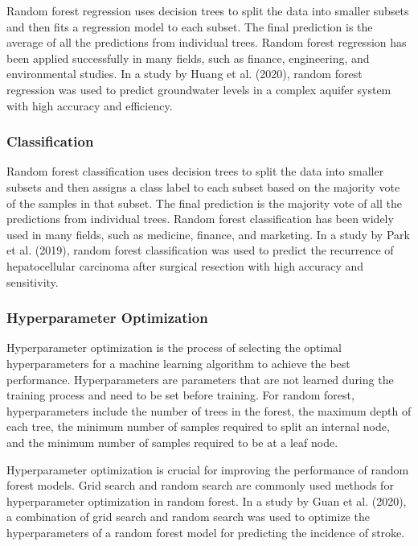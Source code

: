 Random forest regression uses decision trees to split the data into
smaller subsets and then fits a regression model to each subset. The
final prediction is the average of all the predictions from individual
trees. Random forest regression has been applied successfully in many
fields, such as finance, engineering, and environmental studies. In a
study by Huang et al. (2020), random forest regression was used to
predict groundwater levels in a complex aquifer system with high
accuracy and efficiency.

\hypertarget{classification}{%
\subsubsection{Classification}\label{classification}}

Random forest classification uses decision trees to split the data into
smaller subsets and then assigns a class label to each subset based on
the majority vote of the samples in that subset. The final prediction is
the majority vote of all the predictions from individual trees. Random
forest classification has been widely used in many fields, such as
medicine, finance, and marketing. In a study by Park et al. (2019),
random forest classification was used to predict the recurrence of
hepatocellular carcinoma after surgical resection with high accuracy and
sensitivity.

\hypertarget{hyperparameter-optimization}{%
\subsubsection{Hyperparameter
Optimization}\label{hyperparameter-optimization}}

Hyperparameter optimization is the process of selecting the optimal
hyperparameters for a machine learning algorithm to achieve the best
performance. Hyperparameters are parameters that are not learned during
the training process and need to be set before training. For random
forest, hyperparameters include the number of trees in the forest, the
maximum depth of each tree, the minimum number of samples required to
split an internal node, and the minimum number of samples required to be
at a leaf node.

Hyperparameter optimization is crucial for improving the performance of
random forest models. Grid search and random search are commonly used
methods for hyperparameter optimization in random forest. In a study by
Guan et al. (2020), a combination of grid search and random search was
used to optimize the hyperparameters of a random forest model for
predicting the incidence of stroke.

